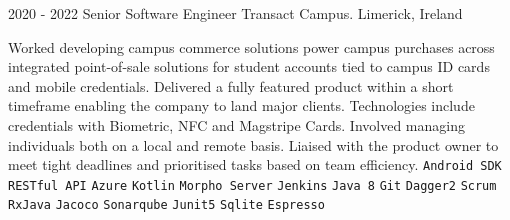 \documentclass[9pt]{developercv} %
\begin{document}
\begin{entrylist}
	\entry
		{2020 - 2022}
		{Senior Software Engineer}
		{Transact Campus. Limerick, Ireland}
{

Worked developing campus commerce solutions power campus purchases across integrated point-of-sale solutions for student accounts tied to campus ID cards and mobile credentials. Delivered a fully featured product within a short timeframe enabling the company to land major clients. Technologies include credentials with Biometric, NFC and Magstripe Cards. 
\newline
\newline
Involved managing individuals both on a local and remote basis. Liaised with the product owner to meet tight deadlines and prioritised tasks based on team efficiency.
 	{
 		\texttt{Android SDK}\slashsep
		 \texttt{RESTful API}\slashsep
		 \texttt{Azure}\slashsep
		 \texttt{Kotlin}\slashsep
		 \texttt{Morpho Server}\slashsep
		 \texttt{Jenkins}\slashsep
		 \texttt{Java 8}\slashsep
		 \texttt{Git}\slashsep
		 \texttt{Dagger2}\slashsep
		 \texttt{Scrum}\slashsep
		 \texttt{RxJava}\slashsep
		 \texttt{Jacoco}\slashsep
		 \texttt{Sonarqube}\slashsep
		 \texttt{Junit5}\slashsep
		 \texttt{Sqlite}\slashsep
		 \texttt{Espresso}\slashsep
	}
}

\end{entrylist}
\end{document}
